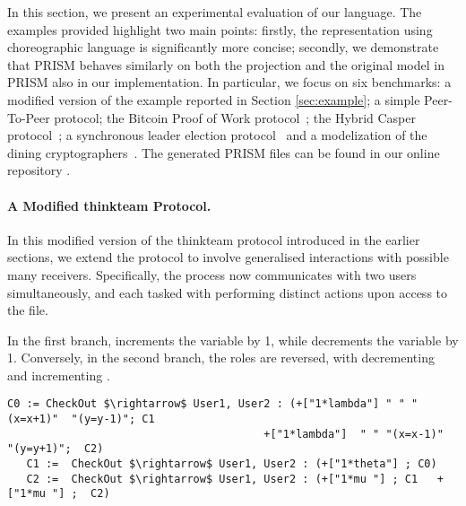 In this section, we present an experimental evaluation of our
  language.  The examples provided highlight two main points: firstly,
  the representation using choreographic language is significantly
  more concise; secondly, we demonstrate that PRISM behaves similarly
  on both the projection and the original model in PRISM also in our
  implementation.
In particular, we focus on six benchmarks: a modified version of the
example reported in Section \ref{sec:example}; a simple Peer-To-Peer protocol;  the Bitcoin Proof of Work
protocol~\cite{DBLP:journals/concurrency/BistarelliNGLMV23}; the
Hybrid Casper
protocol~\cite{DBLP:journals/distribledger/GallettaLMV23}; a synchronous leader election protocol~\cite{IR90} and a modelization of the dining cryptographers~\cite{Cha88}.  The
generated PRISM files can be found in our online repository
\cite{repository}.


\paragraph{A Modified thinkteam Protocol.}
In this modified version of the thinkteam protocol introduced in the earlier sections, we extend the protocol to involve generalised interactions with possible many receivers. Specifically, the  process now communicates with two users simultaneously,  and  each tasked with performing distinct actions upon access to the file. 

 In the first branch,  increments the variable  by 1, while  decrements the variable  by 1. Conversely, in the second branch, the roles are reversed, with  decrementing  and  incrementing .

 \begin{lstlisting}[style=chor-color,breaklines=true, postbreak=\mbox{\textcolor{red}{$\hookrightarrow$}\space},caption={Choreography for the Modified thinkteam Protocol},captionpos=b,label={ex1-chor}]
   C0 := CheckOut $\rightarrow$ User1, User2 : (+["1*lambda"] " " "(x=x+1)"  "(y=y-1)"; C1
                                       	+["1*lambda"]  " " "(x=x-1)"  "(y=y+1)";  C2)
   C1 :=  CheckOut $\rightarrow$ User1, User2 : (+["1*theta"] ; C0)  
   C2 :=  CheckOut $\rightarrow$ User1, User2 : (+["1*mu "] ; C1   +["1*mu "] ;  C2)
 \end{lstlisting}

